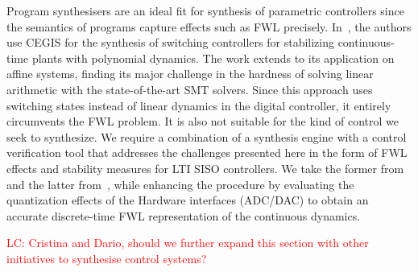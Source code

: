 \documentclass[runningheads,a4paper]{llncs}
\begin{document}
Program synthesisers are an ideal fit for synthesis of parametric
controllers since the semantics of programs capture effects such as FWL
precisely.  In~\cite{DBLP:conf/cdc/RavanbakhshS15}, the authors use CEGIS
for the synthesis of switching controllers for stabilizing continuous-time
plants with polynomial dynamics.  The work extends to its application on
affine systems, finding its major challenge in the hardness of solving
linear arithmetic with the state-of-the-art SMT solvers.  Since this
approach uses switching states instead of linear dynamics in the digital
controller, it entirely circumvents the FWL problem.  It is also not
suitable for the kind of control we seek to synthesize.  We require a
combination of a synthesis engine with a control verification tool that
addresses the challenges presented here in the form of FWL effects and
stability measures for LTI SISO controllers.  We take the former
from~\cite{DBLP:conf/lpar/DavidKL15} and the latter from~\cite{daes20161},
while enhancing the procedure by evaluating the quantization effects of the
Hardware interfaces (ADC/DAC) to obtain an accurate discrete-time FWL
representation of the continuous dynamics.

\textcolor{red}{LC: Cristina and Dario, should we further expand this section with other initiatives to synthesise control systems?}


  
\end{document}
